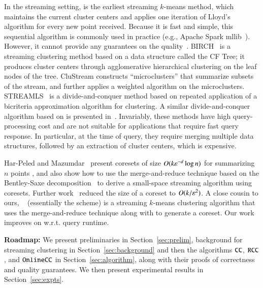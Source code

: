 In the streaming setting, \cite{MacQueen67} is the earliest streaming
$k$-means method, which maintains the current cluster centers and applies one
iteration of Lloyd's algorithm for every new point received.  Because it is fast
and simple, this sequential algorithm is commonly used in practice (e.g., Apache Spark
mllib~\cite{MBY+15}).  However, it cannot provide any guarantees on the
quality~\cite{KMN+04}.  BIRCH~\cite{ZRL96} is a streaming clustering method
based on a data structure called the CF Tree; it produces cluster centers
through agglomerative hierarchical clustering on the leaf nodes of the
tree. CluStream\cite{AHW+03} constructs ``microclusters'' that summarize subsets
of the stream, and further applies a weighted \km algorithm on the
microclusters. STREAMLS~\cite{GMM+03} is a divide-and-conquer method based on
repeated application of a bicriteria approximation algorithm for clustering. A
similar divide-and-conquer algorithm based on \kmpp is presented
in~\cite{AJM09}. Invariably, these methods have high query-processing cost and
are not suitable for applications that require fast query response.  In
particular, at the time of query, they require merging multiple data structures,
followed by an extraction of cluster centers, which is expensive.

Har-Peled and Mazumdar~\cite{HM04} present coresets of size
$O(k \varepsilon^{-d} \log n)$ for summarizing $n$ points \km, and also show how to
use the merge-and-reduce technique based on the Bentley-Saxe
decomposition~\cite{BS80} to derive a small-space streaming algorithm using
coresets. Further work~\cite{HK07, FL11, FSS13} reduced the size of a \km coreset
to $O(k/\varepsilon^2)$. A close cousin to ours, \skmpp~\cite{AMR+12}
(essentially the \ct{} scheme) is a streaming $k$-means clustering algorithm
that uses the merge-and-reduce technique along with \kmpp to generate a
coreset. Our work improves on \skmpp w.r.t. query runtime.

\noindent\textbf{Roadmap:} We present preliminaries in Section~\ref{sec:prelim},
background for streaming clustering in Section~\ref{sec:background} and then the
algorithms $\texttt{CC}$, $\texttt{RCC}$, and $\texttt{OnlineCC}$ in Section~\ref{sec:algorithm}, along
with their proofs of correctness and quality guarantees. We then present
experimental results in Section~\ref{sec:expts}.

